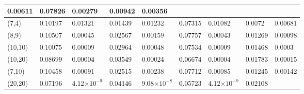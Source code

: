 \documentclass[10pt,twosided]{article}
\numberwithin{equation}{section}
\numberwithin{equation}{section}
\begin{document}
\begin{table}
\begin{tabular}{|p{41pt}|p{32pt}|p{38pt}|p{32pt}|p{38pt}|p{32pt}|p{38pt}|p{32pt}|p{38pt}|}
{0.00611
} & \parbox{32pt}{\raggedright
0.07826
} & \parbox{38pt}{\raggedright
0.00279
} & \parbox{32pt}{\raggedright
0.00942
} & \parbox{38pt}{\raggedright
0.00356
} \\
\hline
\parbox{41pt}{\raggedright
(7,4)
} & \parbox{32pt}{\raggedright
0.10197
} & \parbox{38pt}{\raggedright
0.01321
} & \parbox{32pt}{\raggedright
0.01439
} & \parbox{38pt}{\raggedright
0.01232
} & \parbox{32pt}{\raggedright
0.07315
} & \parbox{38pt}{\raggedright
0.01082
} & \parbox{32pt}{\raggedright
0.0072
} & \parbox{38pt}{\raggedright
0.00681
} \\
\hline
\parbox{41pt}{\raggedright
(8,9)
} & \parbox{32pt}{\raggedright
0.10507
} & \parbox{38pt}{\raggedright
0.00045
} & \parbox{32pt}{\raggedright
0.02567
} & \parbox{38pt}{\raggedright
0.00159
} & \parbox{32pt}{\raggedright
0.07757
} & \parbox{38pt}{\raggedright
0.00043
} & \parbox{32pt}{\raggedright
0.01269
} & \parbox{38pt}{\raggedright
0.00098
} \\
\hline
\parbox{41pt}{\raggedright
(10,10)
} & \parbox{32pt}{\raggedright
0.10075
} & \parbox{38pt}{\raggedright
0.00009
} & \parbox{32pt}{\raggedright
0.02964
} & \parbox{38pt}{\raggedright
0.00048
} & \parbox{32pt}{\raggedright
0.07534
} & \parbox{38pt}{\raggedright
0.00009
} & \parbox{32pt}{\raggedright
0.01468
} & \parbox{38pt}{\raggedright
0.0003
} \\
\hline
\parbox{41pt}{\raggedright
(10,20)
} & \parbox{32pt}{\raggedright
0.08699
} & \parbox{38pt}{\raggedright
0.00004
} & \parbox{32pt}{\raggedright
0.03549
} & \parbox{38pt}{\raggedright
0.00024
} & \parbox{32pt}{\raggedright
0.06674
} & \parbox{38pt}{\raggedright
0.00004
} & \parbox{32pt}{\raggedright
0.01783
} & \parbox{38pt}{\raggedright
0.00015
} \\
\hline
\parbox{41pt}{\raggedright
(7,10)
} & \parbox{32pt}{\raggedright
0.10458
} & \parbox{38pt}{\raggedright
0.00091
} & \parbox{32pt}{\raggedright
0.02515
} & \parbox{38pt}{\raggedright
0.00238
} & \parbox{32pt}{\raggedright
0.07712
} & \parbox{38pt}{\raggedright
0.00085
} & \parbox{32pt}{\raggedright
0.01245
} & \parbox{38pt}{\raggedright
0.00142
} \\
\hline
\parbox{41pt}{\raggedright
(20,20)
} & \parbox{32pt}{\raggedright
0.07196
} & \parbox{38pt}{\raggedright
\small{4.12$\times10^{-9}$}
} & \parbox{32pt}{\raggedright
0.04146
} & \parbox{38pt}{\raggedright
\small{9.08$\times10^{-8}$}
} & \parbox{32pt}{\raggedright
0.05723
} & \parbox{38pt}{\raggedright
\small{4.12$\times10^{-9}$}
} & \parbox{32pt}{\raggedright
0.02108
} & \parbox{38pt}{\raggedright
}
\end{tabular}
\end{table}
\end{document}
